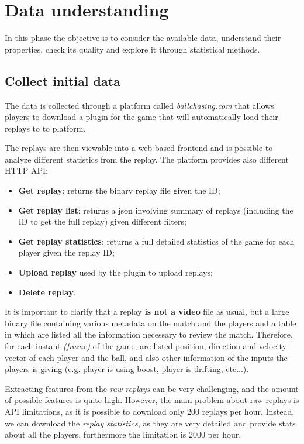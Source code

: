 \section{Data understanding} \label{seq:data_understanding}

 In this phase the objective is to consider the available data, understand their properties, check its quality and explore it through statistical methods.

 \subsection{Collect initial data}

The data is collected through a platform called \textit{ballchasing.com} that allows players to download a plugin for the game that will automatically load their replays to to platform.

The replays are then viewable into a web based frontend and is possible to analyze different statistics from the replay. The platform provides also different HTTP API:

\begin{itemize}
    \item \textbf{Get replay}: returns the binary replay file given the ID;
    \item \textbf{Get replay list}: returns a json involving summary of replays (including the ID to get the full replay) given different filters;
    \item \textbf{Get replay statistics}: returns a full detailed statistics of the game for each player given the replay ID;
    \item \textbf{Upload replay} used by the plugin to upload replays;
    \item \textbf{Delete replay}.
\end{itemize}

It is important to clarify that a replay \textbf{is not a video} file as usual, but a large binary file containing various metadata on the match and the players and a table in which are listed all the information necessary to review the match.
Therefore, for each instant \textit{(frame)} of the game, are listed position, direction and velocity vector of each player and the ball, and also other information of the inputs the players is giving (e.g. player is using boost, player is drifting, etc...).

Extracting features from the \textit{raw replays} can be very challenging, and the amount of possible features is quite high. However, the main problem about raw replays is API limitations, as it is possible to download only 200 replays per hour. Instead, we can download the \textit{replay statistics}, as they are very detailed and provide stats about all the players, furthermore the limitation is 2000 per hour.

